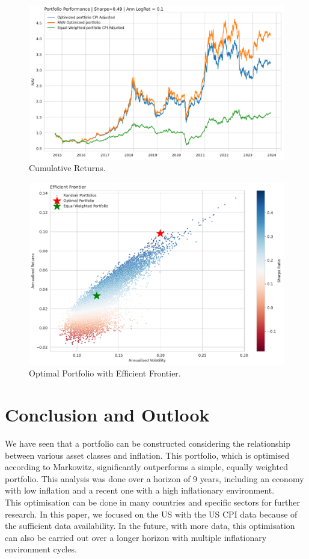 \documentclass{article}
\begin{document}
\begin{figure}[H]
    \centering
    \includegraphics[width=1\textwidth]{figure/PNL.pdf}
    \caption{Cumulative Returns.}
    \label{fig:mesh4}
\end{figure}

\begin{figure}[H]
    \centering
    \includegraphics[width=1\textwidth]{figure/Optimal_PF.pdf}
    \caption{Optimal Portfolio with Efficient Frontier.}
    \label{fig:mesh5}
\end{figure}

\newpage

\section{Conclusion and Outlook}

We have seen that a portfolio can be constructed considering the relationship between various asset classes and inflation. This portfolio, which is optimised according to Markowitz, significantly outperforms a simple, equally weighted portfolio. This analysis was done over a horizon of 9 years, including an economy with low inflation and a recent one with a high inflationary environment. \\

This optimisation can be done in many countries and specific sectors for further research. In this paper, we focused on the US with the US CPI data because of the sufficient data availability. In the future, with more data, this optimisation can also be carried out over a longer horizon with multiple inflationary environment cycles.
\end{document}
